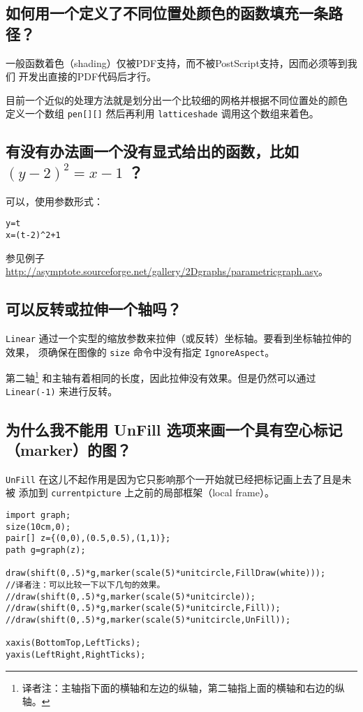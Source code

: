 \subsection{\label{Q6.16}如何用一个定义了不同位置处颜色的函数填充一条路径？}
一般函数着色（shading）仅被PDF支持，而不被PostScript支持，因而必须等到我们
开发出直接的PDF代码后才行。

目前一个近似的处理方法就是划分出一个比较细的网格并根据不同位置处的颜色
定义一个数组 \verb|pen[][]| 然后再利用 \verb|latticeshade| 调用这个数组来着色。


\subsection{\label{Q6.17}有没有办法画一个没有显式给出的函数，比如 $(y-2)^2=x-1$ ？}
可以，使用参数形式：

\begin{lstlisting}
y=t 
x=(t-2)^2+1 
\end{lstlisting}

参见例子 \url{http://asymptote.sourceforge.net/gallery/2Dgraphs/parametricgraph.asy}。

\subsection{\label{Q6.18}可以反转或拉伸一个轴吗？}
\verb|Linear| 通过一个实型的缩放参数来拉伸（或反转）坐标轴。要看到坐标轴拉伸的效果，
须确保在图像的 \verb|size| 命令中没有指定 \verb|IgnoreAspect|。

第二轴\footnote{译者注：主轴指下面的横轴和左边的纵轴，第二轴指上面的横轴和右边的纵轴。}
和主轴有着相同的长度，因此拉伸没有效果。但是仍然可以通过 \verb|Linear(-1)| 
来进行反转。

\subsection{\label{Q6.19}为什么我不能用 UnFill 选项来画一个具有空心标记（marker）的图？}

\verb|UnFill| 在这儿不起作用是因为它只影响那个一开始就已经把标记画上去了且是未被
添加到 \verb|currentpicture| 上之前的局部框架（local frame）。

\begin{lstlisting}
import graph;
size(10cm,0);
pair[] z={(0,0),(0.5,0.5),(1,1)};
path g=graph(z);
 
draw(shift(0,.5)*g,marker(scale(5)*unitcircle,FillDraw(white)));
//译者注：可以比较一下以下几句的效果。
//draw(shift(0,.5)*g,marker(scale(5)*unitcircle));
//draw(shift(0,.5)*g,marker(scale(5)*unitcircle,Fill));
//draw(shift(0,.5)*g,marker(scale(5)*unitcircle,UnFill));
 
xaxis(BottomTop,LeftTicks);
yaxis(LeftRight,RightTicks);
\end{lstlisting}

